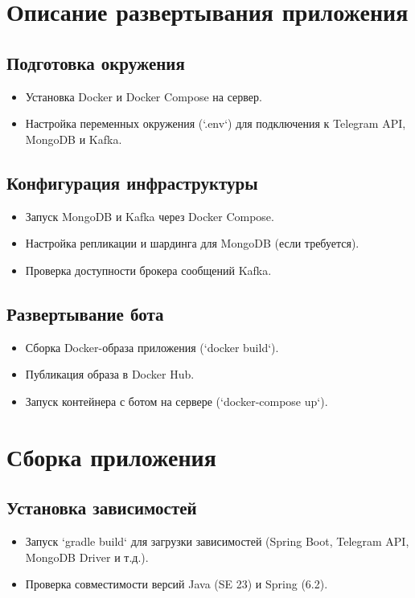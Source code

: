 \documentclass[areasetadvanced]{scrartcl}
\begin{document}
\section{Описание развертывания приложения}

\subsection{Подготовка окружения}
\begin{itemize}
    \item Установка Docker и Docker Compose на сервер.
    \item Настройка переменных окружения (`.env`) для подключения к Telegram API, MongoDB и Kafka.
\end{itemize}

\subsection{Конфигурация инфраструктуры}
\begin{itemize}
    \item Запуск MongoDB и Kafka через Docker Compose.
    \item Настройка репликации и шардинга для MongoDB (если требуется).
    \item Проверка доступности брокера сообщений Kafka.
\end{itemize}

\subsection{Развертывание бота}
\begin{itemize}
    \item Сборка Docker-образа приложения (`docker build`).
    \item Публикация образа в Docker Hub.
    \item Запуск контейнера с ботом на сервере (`docker-compose up`).
\end{itemize}

\section{Сборка приложения}

\subsection{Установка зависимостей}
\begin{itemize}
    \item Запуск `gradle build` для загрузки зависимостей (Spring Boot, Telegram API, MongoDB Driver и т.д.).
    \item Проверка совместимости версий Java (SE 23) и Spring (6.2).
\end{itemize}
\end{document}
